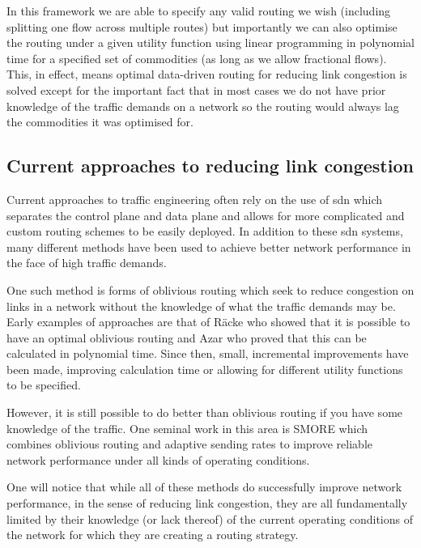 In this framework we are able to specify any valid routing we wish (including splitting one flow across multiple routes) but importantly we can also optimise the routing under a given utility function using linear programming in polynomial time for a specified set of commodities (as long as we allow fractional flows)\cite{cormen2009introduction}. This, in effect, means optimal data-driven routing for reducing link congestion is solved except for the important fact that in most cases we do not have prior knowledge of the traffic demands on a network so the routing would always lag the commodities it was optimised for.

\subsection{Current approaches to reducing link congestion}

Current approaches to traffic engineering often rely on the use of \ac{sdn} which separates the control plane and data plane and allows for more complicated and custom routing schemes to be easily deployed\cite{doi:10.1002/sec.1737}. In addition to these \ac{sdn} systems, many different methods have been used to achieve better network performance in the face of high traffic demands.

One such method is forms of oblivious routing\cite{Bansal2008} which seek to reduce congestion on links in a network without the knowledge of what the traffic demands may be. Early examples of approaches are that of R\"acke\cite{racke2002minimizing} who showed that it is possible to have an optimal oblivious routing and Azar\cite{azar2004optimal} who proved that this can be calculated in polynomial time. Since then, small, incremental improvements have been made, improving calculation time or allowing for different utility functions to be specified\cite{kodialam2008advances}.

However, it is still possible to do better than oblivious routing if you have some knowledge of the traffic. One seminal work in this area is SMORE\cite{kumar2018semi} which combines oblivious routing and adaptive sending rates to improve reliable network performance under all kinds of operating conditions.

One will notice that while all of these methods do successfully improve network performance, in the sense of reducing link congestion, they are all fundamentally limited by their knowledge (or lack thereof) of the current operating conditions of the network for which they are creating a routing strategy. 


